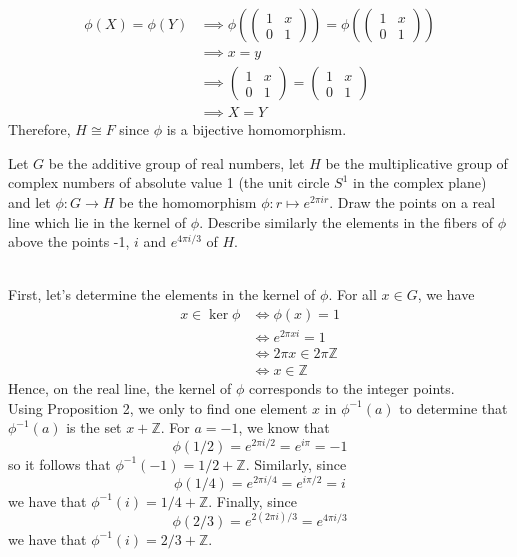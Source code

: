 \begin{solution}
\begin{enumerate}[label = \textbf{(\alph*)}]
        \begin{align*}
            \phi(X) = \phi(Y) &\implies \phi\left(\begin{pmatrix} 1 & x \\ 0 & 1 \end{pmatrix}\right) = \phi\left(\begin{pmatrix} 1 & x \\ 0 & 1 \end{pmatrix}\right) \\
            &\implies x = y \\
            &\implies \begin{pmatrix} 1 & x \\ 0 & 1 \end{pmatrix} = \begin{pmatrix} 1 & x \\ 0 & 1 \end{pmatrix} \\
            &\implies X = Y
        \end{align*}
        Therefore, $H \cong F$ since $\phi$ is a bijective homomorphism. \\
    \end{enumerate}
\end{solution}

\begin{exercise}
    Let $G$ be the additive group of real numbers, let $H$ be the multiplicative group of complex numbers of absolute value 1 (the unit circle $S^1$ in the complex plane) and let $\phi : G \to H$ be the homomorphism $\phi : r \mapsto e^{2\pi ir}$. Draw the points on a real line which lie in the kernel of $\phi$. Describe similarly the elements in the fibers of $\phi$ above the points -1, $i$ and $e^{4\pi i / 3}$ of $H$. \\
\end{exercise}

\begin{solution}
    \\ First, let's determine the elements in the kernel of $\phi$. For all $x \in G$, we have
    \begin{align*}
        x \in \ker \phi &\iff \phi(x) = 1 \\
        &\iff e^{2\pi xi} = 1 \\
        &\iff 2\pi x \in 2\pi \mathbb{Z} \\
        &\iff x \in \mathbb{Z}
    \end{align*}
    Hence, on the real line, the kernel of $\phi$ corresponds to the integer points. \\
    Using Proposition 2, we only to find one element $x$ in $\phi^{-1}(a)$ to determine that $\phi^{-1}(a)$ is the set $x + \mathbb{Z}$. For $a = -1$, we know that 
    $$\phi(1/2) = e^{2\pi i /2} = e^{i\pi} = -1$$
    so it follows that $\phi^{-1}(-1) = 1/2 + \mathbb{Z}$. Similarly, since 
    $$\phi(1/4) = e^{2\pi i /4} = e^{i\pi/2} = i$$
    we have that $\phi^{-1}(i) = 1/4 + \mathbb{Z}$. Finally, 
    since 
    $$\phi(2/3) = e^{2(2\pi i)/3} = e^{4\pi i/3}$$
    we have that $\phi^{-1}(i) = 2/3 + \mathbb{Z}$. \\
\end{solution}


